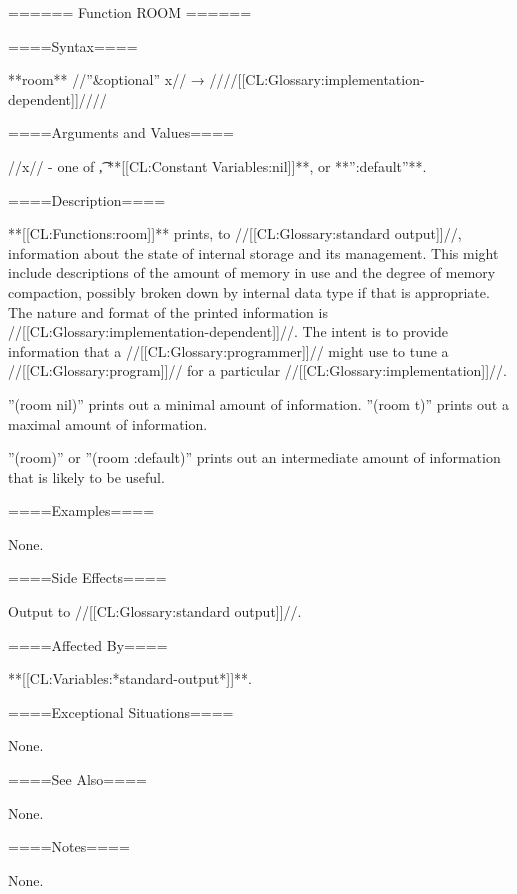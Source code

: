 ====== Function ROOM ======

====Syntax====

**room** //''&optional'' x// → ////[[CL:Glossary:implementation-dependent]]////

====Arguments and Values====

//x// - one of \t, **[[CL:Constant Variables:nil]]**, or **'':default''**.

====Description====

**[[CL:Functions:room]]** prints, to //[[CL:Glossary:standard output]]//, information about the state of internal storage and its management. This might include descriptions of the amount of memory in use and the degree of memory compaction, possibly broken down by internal data type if that is appropriate. The nature and format of the printed information is //[[CL:Glossary:implementation-dependent]]//. The intent is to provide information that a //[[CL:Glossary:programmer]]// might use to tune a //[[CL:Glossary:program]]// for a particular //[[CL:Glossary:implementation]]//.

''(room nil)'' prints out a minimal amount of information. ''(room t)'' prints out a maximal amount of information.

''(room)'' or ''(room :default)'' prints out an intermediate amount of information that is likely to be useful.

====Examples====

None.

====Side Effects====

Output to //[[CL:Glossary:standard output]]//.

====Affected By====

**[[CL:Variables:*standard-output*]]**.

====Exceptional Situations====

None.

====See Also====

None.

====Notes====

None.

